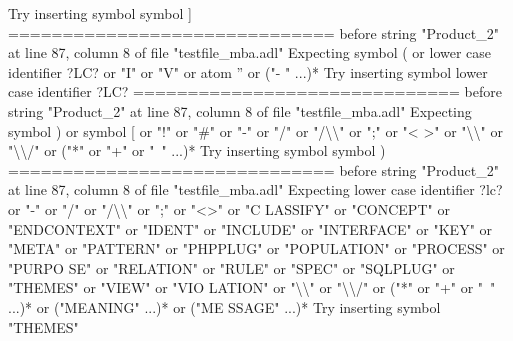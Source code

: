{  Try inserting symbol symbol ]\newline
  \newline
  ==============================\newline
  \newline
  before string "Product\_2" at line 87, column 8 of file "testfile\_mba.adl"\newline
  Expecting symbol ( or lower case identifier ?LC? or "I" or "V" or atom '' or ("-\newline
  " ...)*\newline
  Try inserting symbol lower case identifier ?LC?\newline
  \newline
  ==============================\newline
  \newline
  before string "Product\_2" at line 87, column 8 of file "testfile\_mba.adl"\newline
  Expecting symbol ) or symbol [ or "!" or "\#" or "-" or "/" or "/\textbackslash{}\textbackslash{}" or ";" or "<\newline
  >" or "\textbackslash{}\textbackslash{}" or "\textbackslash{}\textbackslash{}/" or ("*" or "+" or "~" ...)*\newline
  Try inserting symbol symbol )\newline
  \newline
  ==============================\newline
  \newline
  before string "Product\_2" at line 87, column 8 of file "testfile\_mba.adl"\newline
  Expecting lower case identifier ?lc? or "-" or "/" or "/\textbackslash{}\textbackslash{}" or ";" or "<>" or "C\newline
  LASSIFY" or "CONCEPT" or "ENDCONTEXT" or "IDENT" or "INCLUDE" or "INTERFACE" or\newline
  "KEY" or "META" or "PATTERN" or "PHPPLUG" or "POPULATION" or "PROCESS" or "PURPO\newline
  SE" or "RELATION" or "RULE" or "SPEC" or "SQLPLUG" or "THEMES" or "VIEW" or "VIO\newline
  LATION" or "\textbackslash{}\textbackslash{}" or "\textbackslash{}\textbackslash{}/" or ("*" or "+" or "~" ...)* or ("MEANING" ...)* or ("ME\newline
  SSAGE" ...)*\newline
  Try inserting symbol "THEMES"\newline
  \newline
}
